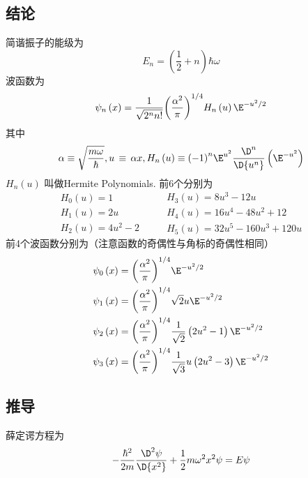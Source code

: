 
\subsection{结论}

简谐振子的能级为
\begin{equation}
{E_n} = \left( {\frac12 + n} \right)\hbar \omega 
\end{equation}
波函数为
\begin{equation}
{\psi_n}\left( x \right) = \frac{1}{\sqrt {{2^n}n!} }{\left( {\frac{\alpha ^2}{\pi }} \right)^{1/4}}{H_n}\left( u \right){\E^{ - {u^2}/2}}
\end{equation}
其中
\begin{equation}
\alpha  \equiv \sqrt {\frac{m\omega }{\hbar }} , u\, \equiv \,\alpha x, {H_n}\left( u \right) \equiv {\left( { - 1} \right)^n}{\E^{u^2}}\frac{\D^n}{\D{u^n}}\left( {\E^{ - {u^2}}} \right)
\end{equation}
${H_n}\left( u \right)$ 叫做Hermite Polynomials. 前6个分别为
\begin{equation}
\begin{array}{l}
{H_0}\left( u \right) = 1\\
{H_1}\left( u \right) = 2u\\
{H_2}\left( u \right) = 4{u^2} - 2
\end{array}
\qquad
\begin{array}{l}
{H_3}\left( u \right) = 8{u^3} - 12u\\
{H_4}\left( u \right) = 16{u^4} - 48{u^2} + 12\\
{H_5}\left( u \right) = 32{u^5} - 160{u^3} + 120u
\end{array}
\end{equation}
前4个波函数分别为（注意函数的奇偶性与角标的奇偶性相同）
\begin{equation}\begin{aligned}
{\psi_0}\left( x \right) &= {\left( {\frac{\alpha ^2}{\pi }} \right)^{1/4}}{\E^{ - {u^2}/2}}\\
{\psi_1}\left( x \right) &= {\left( {\frac{\alpha ^2}{\pi }} \right)^{1/4}}\sqrt 2 u{\E^{ - {u^2}/2}} \\
{\psi_2}\left( x \right) &= {\left( {\frac{\alpha ^2}{\pi }} \right)^{1/4}}\frac{1}{\sqrt 2 }\left( {2{u^2} - 1} \right){\E^{ - {u^2}/2}}\\
{\psi_3}\left( x \right) &= {\left( {\frac{\alpha ^2}{\pi }} \right)^{1/4}}\frac{1}{\sqrt 3 }u\left( {2{u^2} - 3} \right){\E^{ - {u^2}/2}}
\end{aligned}\end{equation}
\subsection{推导}%

薛定谔方程为
\begin{equation}
- \frac{\hbar ^2}{2m}\frac{{\D^2}\psi }{\D{x^2}} + \frac12  m{\omega ^2}{x^2}\psi  = E\psi
\end{equation}